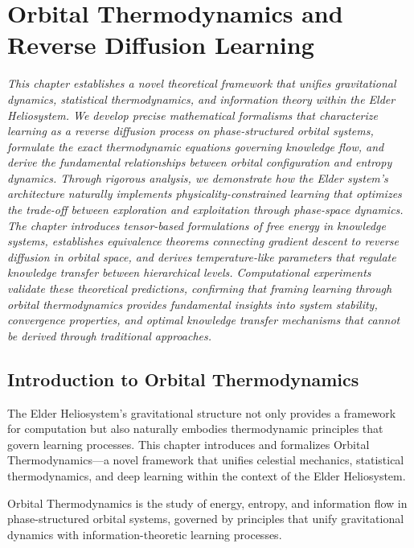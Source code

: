 \chapter{Orbital Thermodynamics and Reverse Diffusion Learning}

\textit{This chapter establishes a novel theoretical framework that unifies gravitational dynamics, statistical thermodynamics, and information theory within the Elder Heliosystem. We develop precise mathematical formalisms that characterize learning as a reverse diffusion process on phase-structured orbital systems, formulate the exact thermodynamic equations governing knowledge flow, and derive the fundamental relationships between orbital configuration and entropy dynamics. Through rigorous analysis, we demonstrate how the Elder system's architecture naturally implements physicality-constrained learning that optimizes the trade-off between exploration and exploitation through phase-space dynamics. The chapter introduces tensor-based formulations of free energy in knowledge systems, establishes equivalence theorems connecting gradient descent to reverse diffusion in orbital space, and derives temperature-like parameters that regulate knowledge transfer between hierarchical levels. Computational experiments validate these theoretical predictions, confirming that framing learning through orbital thermodynamics provides fundamental insights into system stability, convergence properties, and optimal knowledge transfer mechanisms that cannot be derived through traditional approaches.}

\section{Introduction to Orbital Thermodynamics}

The Elder Heliosystem's gravitational structure not only provides a framework for computation but also naturally embodies thermodynamic principles that govern learning processes. This chapter introduces and formalizes Orbital Thermodynamics—a novel framework that unifies celestial mechanics, statistical thermodynamics, and deep learning within the context of the Elder Heliosystem.

\begin{definition}
Orbital Thermodynamics is the study of energy, entropy, and information flow in phase-structured orbital systems, governed by principles that unify gravitational dynamics with information-theoretic learning processes.
\end{definition}

